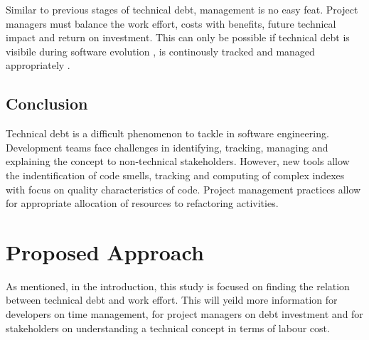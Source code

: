 \documentclass{mprop}
\begin{document}
Similar to previous stages of technical debt, management is no easy feat.
Project managers must balance the work effort, costs with benefits, future
technical impact and return on investment. This can only be possible if
technical debt is visibile during software evolution \cite{Lim2012}
\cite{Morgenthaler2012} \cite{Codabux2013}, is continously tracked and managed
appropriately \cite{Cunningham1993}.

\subsection{Conclusion}

Technical debt is a difficult phenomenon to tackle in software engineering.
Development teams face challenges in identifying, tracking, managing and
explaining the concept to non-technical stakeholders. However, new tools allow
the indentification of code smells, tracking and computing of complex indexes
with focus on quality characteristics of code. Project management practices
allow for appropriate allocation of resources to refactoring activities.

\section{Proposed Approach}
\label{proposed-work}

As mentioned, in the introduction, this study is focused on finding the relation
between technical debt and work effort. This will yeild more information for
developers on time management, for project managers on debt investment and for
stakeholders on understanding a technical concept in terms of labour cost.
\end{document}
